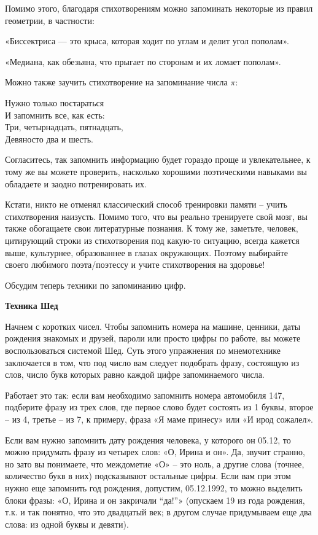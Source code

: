 Помимо этого, благодаря стихотворениям можно запоминать некоторые из правил геометрии, в частности:

«Биссектриса --- это крыса, которая ходит по углам и делит угол пополам».

«Медиана, как обезьяна, что прыгает по сторонам и их ломает пополам».

Можно также заучить стихотворение на запоминание числа $\pi$:

\begin{fancyquotes}
    \begin{flushright}
        Нужно только постараться\\
        И запомнить все, как есть:\\
        Три, четырнадцать, пятнадцать,\\
        Девяносто два и шесть.
    \end{flushright}
\end{fancyquotes}

Согласитесь, так запомнить информацию будет гораздо проще и увлекательнее, к тому же вы можете проверить, насколько хорошими поэтическими навыками вы обладаете и заодно потренировать их.

Кстати, никто не отменял классический способ тренировки памяти – учить стихотворения наизусть. Помимо того, что вы реально тренируете свой мозг, вы также обогащаете свои литературные познания. К тому же, заметьте, человек, цитирующий строки из стихотворения под какую-то ситуацию, всегда кажется выше, культурнее, образованнее в глазах окружающих. Поэтому выбирайте своего любимого поэта/поэтессу и учите стихотворения на здоровье!

Обсудим теперь техники по запоминанию цифр.

\textbf{Техника Шед}

Начнем с коротких чисел. Чтобы запомнить номера на машине, ценники, даты рождения знакомых и друзей, пароли или просто цифры по работе, вы можете воспользоваться системой Шед. Суть этого упражнения по мнемотехнике заключается в том, что под число вам следует подобрать фразу, состоящую из слов, число букв которых равно каждой цифре запоминаемого числа.

Работает это так: если вам необходимо запомнить номера автомобиля 147, подберите фразу из трех слов, где первое слово будет состоять из 1 буквы, второе – из 4, третье – из 7, к примеру, фраза «Я маме принесу» или «И ирод сожалел».

Если вам нужно запомнить дату рождения человека, у которого он 05.12, то можно придумать фразу из четырех слов: «О, Ирина и он». Да, звучит странно, но зато вы понимаете, что междометие «О» – это ноль, а другие слова (точнее, количество букв в них) подсказывают остальные цифры. Если вам при этом нужно еще запомнить год рождения, допустим, 05.12.1992, то можно выделить блоки фразы: «О, Ирина и он закричали “да!”» (опускаем 19 из года рождения, т.к. и так понятно, что это двадцатый век; в другом случае придумываем еще два слова: из одной буквы и девяти).

